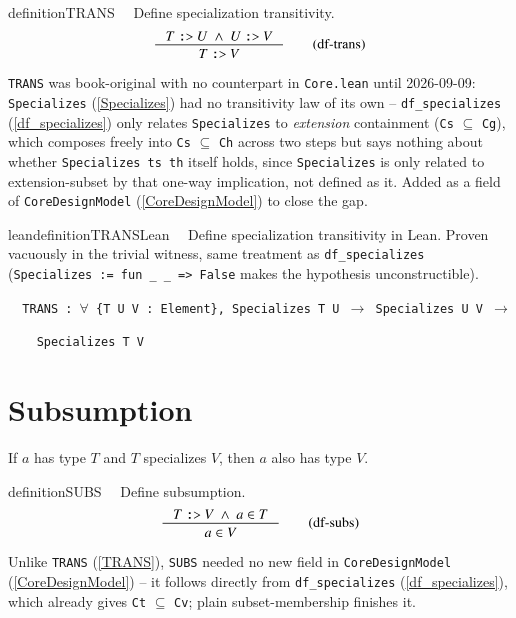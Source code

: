 \begin{restatable}{definition}{TRANS}~~
  Define specialization transitivity.
\begin{align}
\inference
{T~\texttt{:>}~U  ~\wedge~U~\texttt{:>}~V}
{T~\texttt{:>}~V}
\label{eq:df-trans}\tag{df-trans}
\end{align}
\end{restatable}

\pn \texttt{TRANS} was book-original with no counterpart in \texttt{Core.lean} until 2026-09-09:
\texttt{Specializes} (\ref{Specializes}) had no transitivity law of its own --
\texttt{df\_specializes} (\ref{df_specializes}) only relates \texttt{Specializes} to \emph{extension}
containment (\texttt{Cs} $\subseteq$ \texttt{Cg}), which composes freely into \texttt{Cs}
$\subseteq$ \texttt{Ch} across two steps but says nothing about whether \texttt{Specializes ts th}
itself holds, since \texttt{Specializes} is only related to extension-subset by that one-way
implication, not defined as it. Added as a field of \texttt{CoreDesignModel} (\ref{CoreDesignModel})
to close the gap.

\begin{restatable}{leandefinition}{TRANSLean}~~ Define specialization transitivity
in Lean. Proven vacuously in the trivial witness, same treatment as \texttt{df\_specializes}
(\texttt{Specializes := fun \_ \_ => False} makes the hypothesis unconstructible).

\texttt{~~TRANS : $\forall$ \{T U V : Element\}, Specializes T U $\to$ Specializes U V $\to$}

\texttt{~~~~Specializes T V}
\label{TRANS}
\end{restatable}

\section{Subsumption}
If $a$ has type $T$ and $T$ specializes $V$, then $a$ also has type $V$.
\begin{restatable}{definition}{SUBS}~~  
  Define subsumption.  
\begin{align}
\inference
{T~\texttt{:>}~V ~\wedge~a \in T}
{a \in V}
\label{eq:df-subs}\tag{df-subs}
\end{align}
\end{restatable}

\pn Unlike \texttt{TRANS} (\ref{TRANS}), \texttt{SUBS} needed no new field in
\texttt{CoreDesignModel} (\ref{CoreDesignModel}) -- it follows directly from
\texttt{df\_specializes} (\ref{df_specializes}), which already gives \texttt{Ct} $\subseteq$
\texttt{Cv}; plain subset-membership finishes it.

